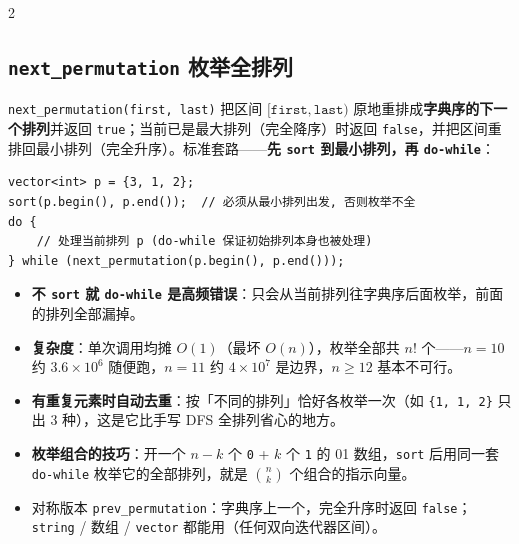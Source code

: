 \begin{multicols*}{2}
		\subsection{\texttt{next\_permutation} 枚举全排列}

		\texttt{next\_permutation(first, last)} 把区间 $[\texttt{first}, \texttt{last})$ 原地重排成\textbf{字典序的下一个排列}并返回 \texttt{true}；当前已是最大排列（完全降序）时返回 \texttt{false}，并把区间重排回最小排列（完全升序）。标准套路——\textbf{先 \texttt{sort} 到最小排列，再 \texttt{do-while}}：

		\begin{verbatim}
vector<int> p = {3, 1, 2};
sort(p.begin(), p.end());  // 必须从最小排列出发, 否则枚举不全
do {
	// 处理当前排列 p (do-while 保证初始排列本身也被处理)
} while (next_permutation(p.begin(), p.end()));
		\end{verbatim}

		\begin{itemize}
			\item \textbf{不 \texttt{sort} 就 \texttt{do-while} 是高频错误}：只会从当前排列往字典序后面枚举，前面的排列全部漏掉。
			\item \textbf{复杂度}：单次调用均摊 $O(1)$（最坏 $O(n)$），枚举全部共 $n!$ 个——$n = 10$ 约 $3.6 \times 10^6$ 随便跑，$n = 11$ 约 $4 \times 10^7$ 是边界，$n \ge 12$ 基本不可行。
			\item \textbf{有重复元素时自动去重}：按「不同的排列」恰好各枚举一次（如 \texttt{\{1, 1, 2\}} 只出 3 种），这是它比手写 DFS 全排列省心的地方。
			\item \textbf{枚举组合的技巧}：开一个 $n - k$ 个 \texttt{0} + $k$ 个 \texttt{1} 的 01 数组，\texttt{sort} 后用同一套 \texttt{do-while} 枚举它的全部排列，就是 $\binom{n}{k}$ 个组合的指示向量。
			\item 对称版本 \texttt{prev\_permutation}：字典序上一个，完全升序时返回 \texttt{false}；\texttt{string} / 数组 / \texttt{vector} 都能用（任何双向迭代器区间）。
		\end{itemize}
	\end{multicols*}

